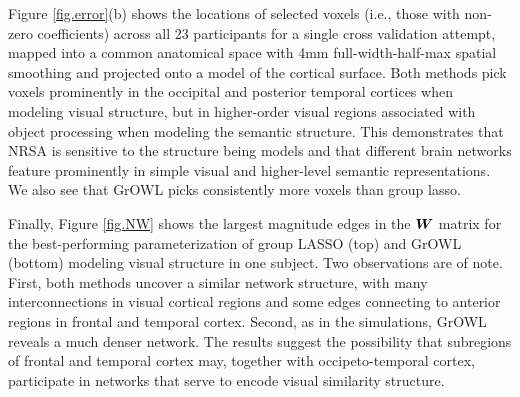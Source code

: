 Figure \ref{fig.error}(b) shows the locations of selected voxels (i.e., those with non-zero
coefficients) across all 23 participants for a single cross validation attempt, mapped into a common anatomical space with 4mm
full-width-half-max spatial smoothing and projected onto a model of the cortical surface.
Both methods pick voxels prominently in the occipital and posterior temporal cortices when
modeling visual structure, but in higher-order visual regions associated with object
processing when modeling the semantic structure. This demonstrates that NRSA is sensitive
to the structure being models and that different brain networks feature prominently in
simple visual and higher-level semantic representations. We also see that GrOWL
picks consistently more voxels than group lasso.

Finally, Figure \ref{fig.NW} shows the largest magnitude edges in the $\boldsymbol{W}$ matrix for the
best-performing parameterization of group LASSO (top) and GrOWL (bottom) modeling visual
structure in one subject.
Two observations are of note. First, both methods uncover a similar network structure, with
many interconnections in visual cortical regions and some edges connecting to anterior
regions in frontal and temporal cortex. Second, as in the simulations, GrOWL reveals a
much denser network. The results suggest the possibility that subregions of frontal and
temporal cortex may, together with occipeto-temporal cortex, participate in networks that
serve to encode visual similarity structure.

